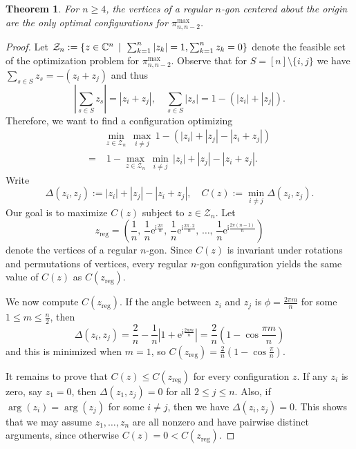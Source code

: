 \documentclass[reqno,hidelinks,11pt]{amsart}
\numberwithin{equation}{section}
\newtheorem{theorem}{Theorem}[section]
\def\CC{\mathbb{C}}
\newcommand{\suchthat}{\;\ifnum\currentgrouptype=16 \middle\fi|\;}
\begin{document}
\begin{theorem}\label{thm: optimality of regular n-gon}
For $n \geq 4$, the vertices of a regular $n$-gon centered about the origin are the only optimal configurations for $\pi_{n,n-2}^{\max}$.
\end{theorem}
\begin{proof}
Let $\mathcal{Z}_n := \{z \in \CC^n \, \suchthat \, \sum_{k=1}^n |z_k| = 1, \sum_{k=1}^n z_k=0\} $ denote the feasible set of the optimization problem for $\pi_{n,n-2}^{\max}$. 
Observe that for $S = [n] \setminus \{i, j\}$ we have $\sum_{s \in S}z_s = -(z_i+z_j)$ and thus 
\[\left| \sum_{s \in S}z_s \right|= |z_i+z_j|, \quad \sum_{s \in S}|z_s| = 1-(|z_i|+|z_j|).\] 
Therefore, we want to find a configuration optimizing
    \begin{align} 
    &\min_{z \in \mathcal{Z}_n}\,\max_{i \neq j}\,   1- \left( |z_i|+|z_j| - |z_i+z_j|  \right)  \nonumber \\ 
     = &\; 1-\max_{z \in \mathcal{Z}_n}\,\min_{i \neq j}\, |z_i|+|z_j| - |z_i+z_j|.    \nonumber 
    \end{align} Write 
    \[
    \Delta(z_i,z_j):= |z_i|+|z_j| - |z_i+z_j|, \quad C(z) := \min_{i \neq j} \Delta(z_i,z_j).
    \]
Our goal is to maximize $C(z)$ subject to $z \in \mathcal{Z}_n$. Let\[z_{\operatorname{reg}}=\left(\frac{1}{n},\,\frac{1}{n}\mathrm{e}^{\mathrm{i}\frac{2\pi}{n}}, \,\frac{1}{n}\mathrm{e}^{\mathrm{i}\frac{2\pi \cdot 2}{n}},\,\dots,\,\frac{1}{n}\mathrm{e}^{\mathrm{i}\frac{2\pi (n-1)}{n}}\right)\]
denote the vertices of a regular $n$-gon. Since $C(z)$ is invariant under rotations and permutations of vertices, every regular $n$-gon configuration yields the same value of $C(z)$ as $C(z_{\operatorname{reg}})$. 

We now compute $C(z_{\operatorname{reg}})$. If the angle between $z_i$ and $z_j$ is $\phi=\frac{2\pi m}{n}$ for some $1 \leq m \leq \frac{n}{2}$, then  
\[ \Delta(z_i,z_{j}) = \frac{2}{n}-\frac{1}{n}\left|1+\mathrm{e}^{\mathrm{i}\frac{2\pi m}{n}}\right|= \frac{2}{n}\left(1-\cos\frac{\pi m}{n}\right)\]
and this is minimized when $m=1$, so $C(z_{\operatorname{reg}})=\frac{2}{n}\left(1-\cos\frac{\pi }{n}\right)$.

It remains to prove that $C(z) \leq C(z_{\operatorname{reg}})$ for every configuration $z$. If any $z_i$ is zero, say $z_1=0$, then $\Delta(z_1,z_j) =0$ for all $2 \leq j \leq n$. Also, if $\arg (z_i)= \arg(z_j)$ for some $i \neq j$, then we have $\Delta(z_i,z_j)=0$. This shows that we may assume $z_1, \ldots, z_n$ are all nonzero and have pairwise distinct arguments, since otherwise $C(z)=0< C(z_{\operatorname{reg}})$.


\end{proof}
\end{document}
